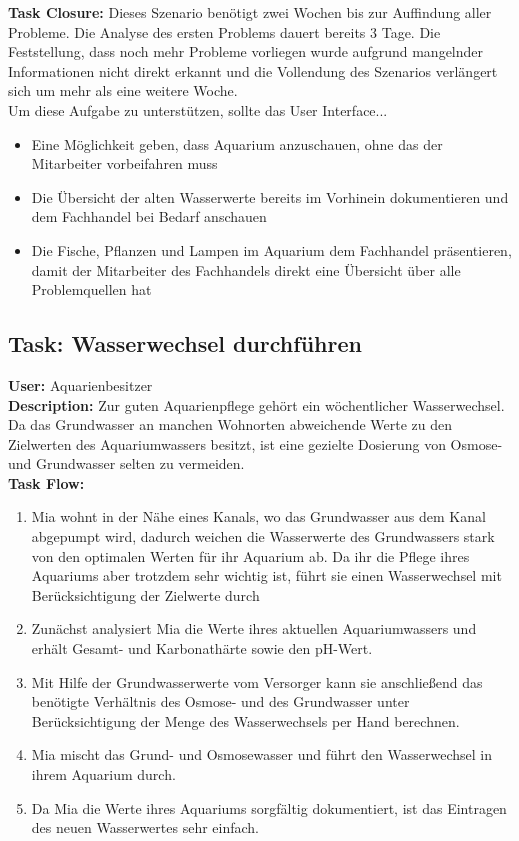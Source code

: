  \textbf{Task Closure:} Dieses Szenario benötigt zwei Wochen bis zur Auffindung aller Probleme. Die Analyse des ersten Problems dauert bereits 3 Tage. Die Feststellung, dass noch mehr Probleme vorliegen wurde aufgrund mangelnder Informationen nicht direkt erkannt und die Vollendung des Szenarios verlängert sich um mehr als eine weitere Woche.\\

Um diese Aufgabe zu unterstützen, sollte das User Interface...
\begin{itemize}
  \item Eine Möglichkeit geben, dass Aquarium anzuschauen, ohne das der Mitarbeiter vorbeifahren muss
  \item Die Übersicht der alten Wasserwerte bereits im Vorhinein dokumentieren und dem Fachhandel bei Bedarf anschauen
  \item Die Fische, Pflanzen und Lampen im Aquarium dem Fachhandel präsentieren, damit der Mitarbeiter des Fachhandels direkt eine Übersicht über alle Problemquellen hat
\end{itemize}


\subsection{Task: Wasserwechsel durchführen}

\textbf{User:} Aquarienbesitzer\\

\textbf{Description:} Zur guten Aquarienpflege gehört ein wöchentlicher Wasserwechsel. Da das Grundwasser an manchen Wohnorten abweichende Werte zu den Zielwerten des Aquariumwassers besitzt, ist eine gezielte Dosierung von Osmose- und Grundwasser selten zu vermeiden.\\

\textbf{Task Flow:}
\begin{enumerate}
 \item Mia wohnt in der Nähe eines Kanals, wo das Grundwasser aus dem Kanal abgepumpt wird, dadurch weichen die Wasserwerte des Grundwassers stark von den optimalen Werten für ihr Aquarium ab. Da ihr die Pflege ihres Aquariums aber trotzdem sehr wichtig ist, führt sie einen Wasserwechsel mit Berücksichtigung der Zielwerte durch
 \item Zunächst analysiert Mia die Werte ihres aktuellen Aquariumwassers und erhält Gesamt- und Karbonathärte sowie den pH-Wert.
 \item Mit Hilfe der Grundwasserwerte vom Versorger kann sie anschließend das benötigte Verhältnis des Osmose- und des Grundwasser unter Berücksichtigung der Menge des Wasserwechsels per Hand berechnen.
 \item Mia mischt das Grund- und Osmosewasser und führt den Wasserwechsel in ihrem Aquarium durch.
 \item Da Mia die Werte ihres Aquariums sorgfältig dokumentiert, ist das Eintragen des neuen Wasserwertes sehr einfach.
\end{enumerate}

